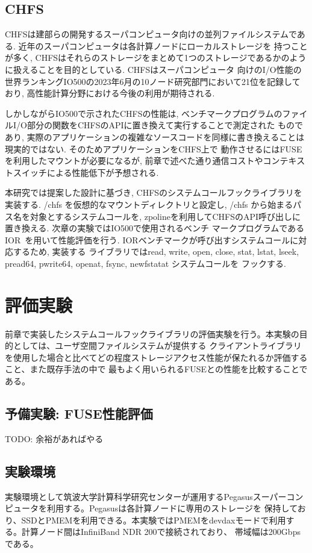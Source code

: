 \documentclass[a4paper,11pt]{jreport}
\begin{document}
\section{CHFS}
CHFSは建部らの開発するスーパコンピュータ向けの並列ファイルシステムである. 近年のスーパコンピュータは各計算ノードにローカルストレージを
持つことが多く, CHFSはそれらのストレージをまとめて1つのストレージであるかのように扱えることを目的としている. CHFSはスーパコンピュータ
向けのI/O性能の世界ランキングIO500の2023年6月の10ノード研究部門において21位を記録しており, 高性能計算分野における今後の利用が期待される.

しかしながらIO500で示されたCHFSの性能は, ベンチマークプログラムのファイルI/O部分の関数をCHFSのAPIに置き換えて実行することで測定された
ものであり, 実際のアプリケーションの複雑なソースコードを同様に書き換えることは現実的ではない. そのためアプリケーションをCHFS上で
動作させるにはFUSEを利用したマウントが必要になるが, 前章で述べた通り通信コストやコンテキストスイッチによる性能低下が予想される.

本研究では提案した設計に基づき, CHFSのシステムコールフックライブラリを実装する. /chfs を仮想的なマウントディレクトリと設定し, /chfs
から始まるパス名を対象とするシステムコールを, zpolineを利用してCHFSのAPI呼び出しに置き換える. 次章の実験ではIO500で使用されるベンチ
マークプログラムであるIOR~\cite{ior}を用いて性能評価を行う. IORベンチマークが呼び出すシステムコールに対応するため, 実装する
ライブラリではread, write, open, close, stat, lstat, lseek, pread64, pwrite64, openat, fsync, newfstatat システムコールを
フックする.

\chapter{評価実験}
前章で実装したシステムコールフックライブラリの評価実験を行う。本実験の目的としては、ユーザ空間ファイルシステムが提供する
クライアントライブラリを使用した場合と比べてどの程度ストレージアクセス性能が保たれるか評価すること、また既存手法の中で
最もよく用いられるFUSEとの性能を比較することである。

\section{予備実験: FUSE性能評価}
TODO: 余裕があればやる
\section{実験環境}
実験環境として筑波大学計算科学研究センターが運用するPegasusスーパーコンピュータを利用する。Pegasusは各計算ノードに専用のストレージを
保持しており、SSDとPMEMを利用できる。本実験ではPMEMをdevdaxモードで利用する。計算ノード間はInfiniBand NDR 200で接続されており、
帯域幅は200Gbpsである。
\end{document}
